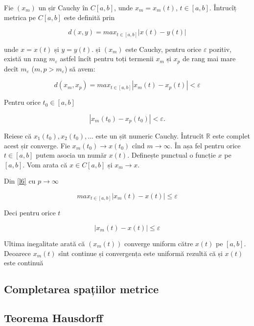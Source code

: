 \documentclass[a4paper,12pt]{article}
\theoremstyle{change}
\newenvironment{proof}[1][Proof]{\begin{trivlist}
\item[\hskip \labelsep {\bfseries #1}]}{\end{trivlist}}
\begin{document}
\begin{proof}
Fie $(x_m)$ un șir Cauchy în $C[a,b]$, unde $x_m=x_m(t)$, $t\in [a,b]$. Întrucîț metrica pe $C[a,b]$ este definită prin

\[
  d(x,y) = max_{t\in [a,b]} |x(t)-y(t)|
\]

unde $x=x(t)$ și $y=y(t)$.  și $(x_m)$ este Cauchy, pentru orice $\varepsilon$ pozitiv, există un rang $m_{\varepsilon}$ astfel încît pentru toți termenii $x_m$ și $x_p$ de rang mai mare decît $m_{\varepsilon}$ ($m,p>m_{\varepsilon}$) să avem:

\[
\label{l6}
d(x_m,x_p) = max_{t\in [a,b]} |x_m(t)-x_p(t)|<\varepsilon
\]

Pentru orice $t_0\in [a,b]$

\[
|x_m(t_0)-x_p(t_0)|<\varepsilon.
\]

Reiese că $x_1(t_0),x_2(t_0),...$ este un șit numeric Cauchy. Întrucît $\mathbb{R}$ este complet acest șir converge. Fie $x_m(t_0)\to x(t_0)$ cînd $m\to\infty$. În așa fel pentru orice $t\in[a,b]$ putem asocia un număr $x(t)$. Definește punctual o funcție $x$ pe $[a,b]$. Vom arata că $x\in C[a,b]$ și $x_m\to x$.

Din \ref{l6} cu $p\to\infty$

\[
max_{t\in [a,b]} |x_m(t)-x(t)|\leq \varepsilon
\]

Deci pentru orice $t$

\[
|x_m(t)-x(t)|\leq \varepsilon
\]

Ultima inegalitate arată că $(x_m(t))$ converge uniform către $x(t)$ pe $[a,b]$. Deoarece $x_m(t)$ sînt continue și convergența este uniformă rezultă că și $x(t)$ este continuă
\end{proof}



\subsection{Completarea spațiilor metrice}

\subsection{Teorema Hausdorff}
\end{document}
